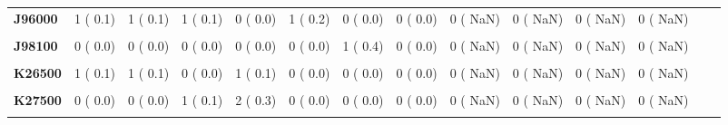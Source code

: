 \documentclass[
]{article}
\begin{document}
\begin{table}[H]
\begin{tabular}[t]{>{\raggedright\arraybackslash}p{5em}ccccccccccccc}
\textbf{J96000} & 1 (  0.1) & 1 (  0.1) & 1 (  0.1) & 0 (  0.0) & 1 (  0.2) & 0 (  0.0) & 0 (  0.0) & 0 (  NaN) & 0 (  NaN) & 0 (  NaN) & 0 (  NaN) &  & \\
\textbf{\cellcolor{gray!10}{J96900}} & \cellcolor{gray!10}{4 (  0.4)} & \cellcolor{gray!10}{2 (  0.2)} & \cellcolor{gray!10}{0 (  0.0)} & \cellcolor{gray!10}{1 (  0.1)} & \cellcolor{gray!10}{0 (  0.0)} & \cellcolor{gray!10}{1 (  0.4)} & \cellcolor{gray!10}{0 (  0.0)} & \cellcolor{gray!10}{0 (  NaN)} & \cellcolor{gray!10}{0 (  NaN)} & \cellcolor{gray!10}{0 (  NaN)} & \cellcolor{gray!10}{0 (  NaN)} & \cellcolor{gray!10}{} & \cellcolor{gray!10}{}\\
\textbf{J98100} & 0 (  0.0) & 0 (  0.0) & 0 (  0.0) & 0 (  0.0) & 0 (  0.0) & 1 (  0.4) & 0 (  0.0) & 0 (  NaN) & 0 (  NaN) & 0 (  NaN) & 0 (  NaN) &  & \\
\textbf{\cellcolor{gray!10}{J98400}} & \cellcolor{gray!10}{0 (  0.0)} & \cellcolor{gray!10}{2 (  0.2)} & \cellcolor{gray!10}{0 (  0.0)} & \cellcolor{gray!10}{1 (  0.1)} & \cellcolor{gray!10}{0 (  0.0)} & \cellcolor{gray!10}{0 (  0.0)} & \cellcolor{gray!10}{0 (  0.0)} & \cellcolor{gray!10}{0 (  NaN)} & \cellcolor{gray!10}{0 (  NaN)} & \cellcolor{gray!10}{0 (  NaN)} & \cellcolor{gray!10}{0 (  NaN)} & \cellcolor{gray!10}{} & \cellcolor{gray!10}{}\\
\textbf{K26500} & 1 (  0.1) & 1 (  0.1) & 0 (  0.0) & 1 (  0.1) & 0 (  0.0) & 0 (  0.0) & 0 (  0.0) & 0 (  NaN) & 0 (  NaN) & 0 (  NaN) & 0 (  NaN) &  & \\
\textbf{\cellcolor{gray!10}{K26900}} & \cellcolor{gray!10}{1 (  0.1)} & \cellcolor{gray!10}{0 (  0.0)} & \cellcolor{gray!10}{0 (  0.0)} & \cellcolor{gray!10}{0 (  0.0)} & \cellcolor{gray!10}{0 (  0.0)} & \cellcolor{gray!10}{0 (  0.0)} & \cellcolor{gray!10}{0 (  0.0)} & \cellcolor{gray!10}{0 (  NaN)} & \cellcolor{gray!10}{0 (  NaN)} & \cellcolor{gray!10}{0 (  NaN)} & \cellcolor{gray!10}{0 (  NaN)} & \cellcolor{gray!10}{} & \cellcolor{gray!10}{}\\
\textbf{K27500} & 0 (  0.0) & 0 (  0.0) & 1 (  0.1) & 2 (  0.3) & 0 (  0.0) & 0 (  0.0) & 0 (  0.0) & 0 (  NaN) & 0 (  NaN) & 0 (  NaN) & 0 (  NaN) &  & \\
\textbf{\cellcolor{gray!10}{K27900}} & \cellcolor{gray!10}{0 (  0.0)} & \cellcolor{gray!10}{1 (  0.1)} & \cellcolor{gray!10}{0 (  0.0)} & \cellcolor{gray!10}{0 (  0.0)} & \cellcolor{gray!10}{0 (  0.0)} & \cellcolor{gray!10}{0 (  0.0)} & \cellcolor{gray!10}{0 (  0.0)} & \cellcolor{gray!10}{0 (  NaN)} & \cellcolor{gray!10}{0 (  NaN)} & \cellcolor{gray!10}{0 (  NaN)} & \cellcolor{gray!10}{0 (  NaN)} & \cellcolor{gray!10}{} & \cellcolor{gray!10}{}\\

\end{tabular}
\end{table}
\end{document}
